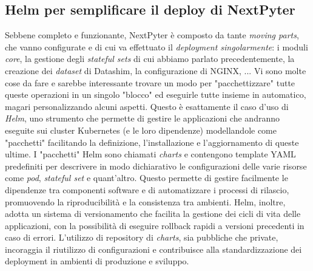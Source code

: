 \subsection{Helm per semplificare il deploy di NextPyter}
Sebbene completo e funzionante, NextPyter è composto da tante \textit{moving parts}, che vanno configurate e di cui va effettuato il \textit{deployment singolarmente}: i moduli \textit{core}, la gestione degli \textit{stateful sets} di cui abbiamo parlato precedentemente, la creazione dei \textit{dataset} di Datashim, la configurazione di NGINX, ...
\newline
Vi sono molte cose da fare e sarebbe interessante trovare un modo per "pacchettizzare" tutte queste operazioni in un singolo "blocco" ed eseguirle tutte insieme in automatico, magari personalizzando alcuni aspetti. Questo è esattamente il caso d'uso di \textit{Helm}, uno strumento che permette di gestire le applicazioni che andranno eseguite sui cluster Kubernetes (e le loro dipendenze) modellandole come "pacchetti" facilitando la definizione, l'installazione e l'aggiornamento di queste ultime. I "pacchetti" Helm sono chiamati \textit{charts} e contengono template YAML predefiniti per descrivere in modo dichiarativo le configurazioni delle varie risorse come \textit{pod}, \textit{stateful set} e quant'altro. Questo permette di gestire facilmente le dipendenze tra componenti software e di automatizzare i processi di rilascio, promuovendo la riproducibilità e la consistenza tra ambienti. Helm, inoltre, adotta un sistema di versionamento che facilita la gestione dei cicli di vita delle applicazioni, con la possibilità di eseguire rollback rapidi a versioni precedenti in caso di errori. L’utilizzo di repository di \textit{charts}, sia pubbliche che private, incoraggia il riutilizzo di configurazioni e contribuisce alla standardizzazione dei deployment in ambienti di produzione e sviluppo.
\newline
